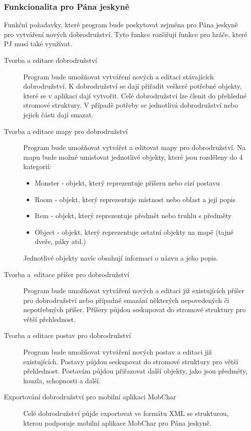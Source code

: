 \documentclass[thesis=B,czech]{resources/FITthesis}[2012/06/26]
\begin{document}
\subsubsection{Funkcionalita pro Pána jeskyně}
Funkční požadavky, které program bude poskytovat zejména pro Pána jeskyně pro vytváření nových dobrodružství. Tyto funkce rozšiřují funkce pro hráče, které PJ musí také využívat.
\begin{description}


\item[Tvorba a editace dobrodružství] Program bude umožňovat vytváření nových a editaci stávajících dobrodružství. K dobrodružství se dají přiřadit veškeré potřebné objekty, které se v aplikaci dají vytvořit. Celé dobrodružství lze členit do přehledné stromové struktury. V případě potřeby se jednotlivá dobrodružství nebo jejich části dají smazat.

\item[Tvorba a editace mapy pro dobrodružství] Program bude umožňovat vytvářet a editovat mapy pro dobrodružství. Na mapu bude možné umisťovat jednotlivé objekty, které jsou rozděleny do 4 kategorií:
\begin{itemize}
\item Monster - objekt, který reprezentuje příšeru nebo cizí postavu
\item Room - objekt, který reprezentuje místnost nebo oblast a její popis
\item Item - objekt, který reprezentuje předmět nebo truhlu s předměty
\item Object - objekt, který reprezentuje ostatní  objekty na mapě (tajné dveře, páky atd.)
\end{itemize}
Jednotlivé objekty navíc obsahují informaci o názvu a jeho popis.

\item[Tvorba a~editace příšer pro dobrodružství] Program bude umožňovat vytváření nových a editaci již existujících příšer pro dobrodružství nebo případné smazání některých nepovedených či nepotřebných příšer. Příšery půjdou seskupovat do stromové struktury pro větší přehlednost.

\item[Tvorba a editace postav pro dobrodružství] Program bude umožňovat vytváření nových postav a editaci již existujících. Postavy půjdou seskupovat do stromové struktury pro větší přehlednost. Postavám půjdou přiřazovat další objekty, jako jsou předměty, kouzla, schopnosti a další.

\item[Exportování dobrodružství pro mobilní aplikaci MobChar] Celé dobrodružství půjde exportovat ve formátu XML se strukturou, kterou podporuje mobilní aplikace MobChar pro Pána jeskyně.


\end{description}
\end{document}
